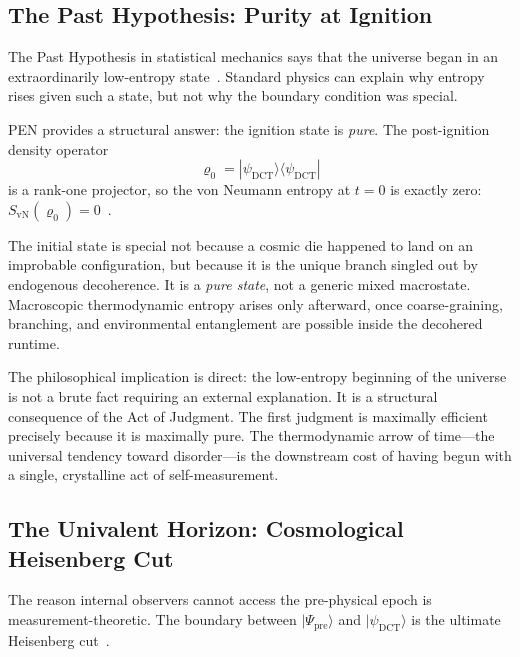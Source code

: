 \documentclass[12pt,a4paper]{article}
\begin{document}
\subsection{The Past Hypothesis: Purity at Ignition}
\label{sec:past}

The Past Hypothesis in statistical mechanics says that the universe began in an extraordinarily low-entropy state~\cite{penrose, carroll}. Standard physics can explain why entropy rises given such a state, but not why the boundary condition was special.

PEN provides a structural answer: the ignition state is \emph{pure}. The post-ignition density operator
\begin{equation}
\varrho_0 = |\psi_{\mathrm{DCT}}\rangle\langle\psi_{\mathrm{DCT}}|
\label{eq:density}
\end{equation}
is a rank-one projector, so the von Neumann entropy at $t = 0$ is exactly zero: $S_{\mathrm{vN}}(\varrho_0) = 0$~\cite{pen2}.

The initial state is special not because a cosmic die happened to land on an improbable configuration, but because it is the unique branch singled out by endogenous decoherence. It is a \emph{pure state}, not a generic mixed macrostate. Macroscopic thermodynamic entropy arises only afterward, once coarse-graining, branching, and environmental entanglement are possible inside the decohered runtime.

The philosophical implication is direct: the low-entropy beginning of the universe is not a brute fact requiring an external explanation. It is a structural consequence of the Act of Judgment. The first judgment is maximally efficient precisely because it is maximally pure. The thermodynamic arrow of time---the universal tendency toward disorder---is the downstream cost of having begun with a single, crystalline act of self-measurement.


\subsection{The Univalent Horizon: Cosmological Heisenberg Cut}
\label{sec:horizon}

The reason internal observers cannot access the pre-physical epoch is measurement-theoretic. The boundary between $|\Psi_{\mathrm{pre}}\rangle$ and $|\psi_{\mathrm{DCT}}\rangle$ is the ultimate Heisenberg cut~\cite{pen2, vneumann}.
\end{document}
